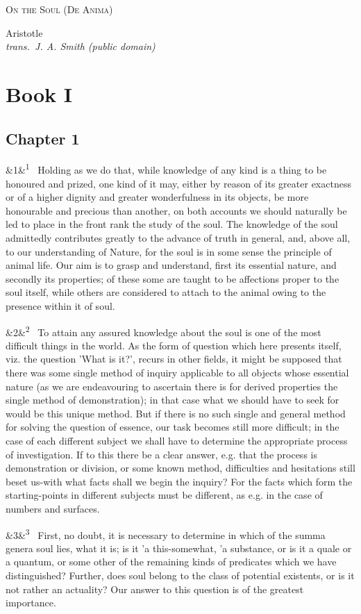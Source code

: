 \documentclass[12pt]{article}
\newcommand{\work}[1]{\begin{center}\LARGE\scshape #1\end{center}}
\newcommand{\attrib}[2]{\begin{center}\large #1\\[2pt]\small\itshape trans.\ #2\end{center}\vspace{1em}}
\newcommand{\para}[1][]{\par\noindent\ifx&#1&\else\textsuperscript{\footnotesize #1}~\fi}
\begin{document}
\work{On the Soul (De Anima)}

\attrib{Aristotle}{J. A. Smith (public domain)}

\section*{Book I}

\subsection*{Chapter 1}

\para[1] Holding as we do that, while knowledge of any kind is a thing to be honoured and prized, one kind of it may, either by reason of its greater exactness or of a higher dignity and greater wonderfulness in its objects, be more honourable and precious than another, on both accounts we should naturally be led to place in the front rank the study of the soul. The knowledge of the soul admittedly contributes greatly to the advance of truth in general, and, above all, to our understanding of Nature, for the soul is in some sense the principle of animal life. Our aim is to grasp and understand, first its essential nature, and secondly its properties; of these some are taught to be affections proper to the soul itself, while others are considered to attach to the animal owing to the presence within it of soul.

\para[2] To attain any assured knowledge about the soul is one of the most difficult things in the world. As the form of question which here presents itself, viz. the question 'What is it?', recurs in other fields, it might be supposed that there was some single method of inquiry applicable to all objects whose essential nature (as we are endeavouring to ascertain there is for derived properties the single method of demonstration); in that case what we should have to seek for would be this unique method. But if there is no such single and general method for solving the question of essence, our task becomes still more difficult; in the case of each different subject we shall have to determine the appropriate process of investigation. If to this there be a clear answer, e.g. that the process is demonstration or division, or some known method, difficulties and hesitations still beset us-with what facts shall we begin the inquiry? For the facts which form the starting-points in different subjects must be different, as e.g. in the case of numbers and surfaces.

\para[3] First, no doubt, it is necessary to determine in which of the summa genera soul lies, what it is; is it 'a this-somewhat, 'a substance, or is it a quale or a quantum, or some other of the remaining kinds of predicates which we have distinguished? Further, does soul belong to the class of potential existents, or is it not rather an actuality? Our answer to this question is of the greatest importance.
\end{document}
